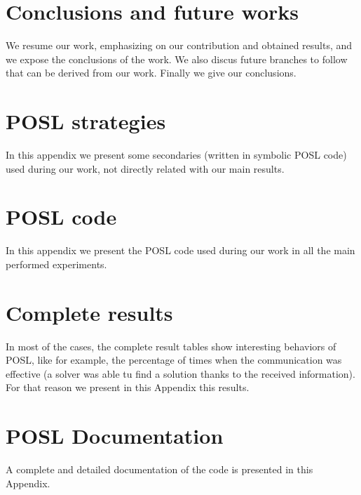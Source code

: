 \documentclass[a4paper]{book} %
\newcommand{\posl}{{\sc POSL}}
\begin{document}
\chapter{Conclusions and future works}

We resume our work, emphasizing on our contribution and obtained results, and we expose the conclusions of the work. We also discus future branches to follow that can be derived from our work. Finally we give our conclusions. 


\begin{appendices}
\noappendicestocpagenum
\addappheadtotoc

\chapter{\posl{} strategies}

In this appendix we present some secondaries \cstrs{} (written in symbolic \posl{} code) used during our work, not directly related with our main results.

\chapter{\posl{} code}

In this appendix we present the \posl{} code used during our work in all the main performed experiments.

\chapter{Complete results}

In most of the cases, the complete result tables show interesting behaviors of \posl{}, like for example, the percentage of times when the communication was effective (a solver was able tu find a solution thanks to the received information). For that reason we present in this Appendix this results.

\chapter{\posl{} Documentation}

A complete and detailed documentation of the code is presented in this Appendix.

\end{appendices}
\end{document}
